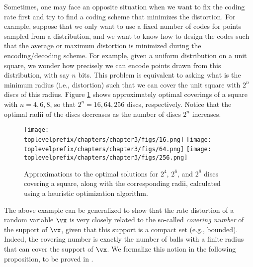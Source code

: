 \documentclass[../../book-main.tex]{subfiles}
\begin{document}
\begin{example}\label{example:sphere-covering-rate-distortion}
	Sometimes, one may face an opposite situation when we want to fix the coding
	rate first and try to find a coding scheme that minimizes the distortion.
	For example, suppose that we only want to use a fixed number of codes for
	points sampled from a distribution, and we want to know how to design the
	codes such that the average or maximum distortion is minimized during the
	encoding/decoding scheme. For example, given a uniform distribution on
	a unit square, we wonder how precisely we can encode points drawn from this
	distribution, with say $n$ bits. This problem is equivalent to asking what
	is the minimum radius (i.e., distortion) such that we can cover the unit
	square with $2^n$ discs of this radius. Figure
	\ref{fig:seven-circles-packing} shows approximately optimal coverings of
	a square with \(n = 4, 6, 8\), so that \(2^{n} = 16, 64, 256\) discs, respectively. Notice that the optimal radii of the discs decreases as the number of discs \(2^{n}\) increases.
	\begin{figure}
		\centering
		\texttt{[image: \\toplevelprefix/chapters/chapter3/figs/16.png]}
		\hfill
		\texttt{[image: \\toplevelprefix/chapters/chapter3/figs/64.png]}
		\hfill
		\texttt{[image: \\toplevelprefix/chapters/chapter3/figs/256.png]}

		\caption{Approximations to the optimal solutions for \(2^{4}\),
		\(2^{6}\), and \(2^{8}\) discs covering a square, along with the
		corresponding radii, calculated using a heuristic optimization algorithm.}
		\label{fig:seven-circles-packing}
	\end{figure}
\end{example}

The above example can be generalized to show that the rate distortion of a random variable \(\vx\) is very closely related to the so-called \textit{covering number} of the support of \(\vx\), given that this support is a compact set (e.g., bounded). Indeed, the covering number is exactly the number of balls with a finite radius that can cover the support of \(\vx\). We formalize this notion in the following proposition, to be proved in .
\end{document}
